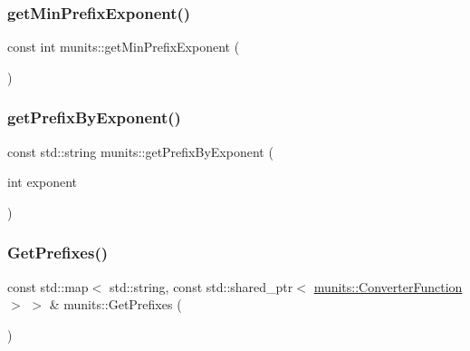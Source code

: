 \mbox{\label{namespacemunits_a348f0717c758e64ada5ef3811299af38}} 
\subsubsection{\texorpdfstring{get\+Min\+Prefix\+Exponent()}{getMinPrefixExponent()}}
{\footnotesize\ttfamily const int munits\+::get\+Min\+Prefix\+Exponent (\begin{DoxyParamCaption}{ }\end{DoxyParamCaption})}

\mbox{\label{namespacemunits_a9ee8078d5f9db8759156a3ff38f9cf39}} 
\subsubsection{\texorpdfstring{get\+Prefix\+By\+Exponent()}{getPrefixByExponent()}}
{\footnotesize\ttfamily const std\+::string munits\+::get\+Prefix\+By\+Exponent (\begin{DoxyParamCaption}\item[{int}]{exponent }\end{DoxyParamCaption})}

\mbox{\label{namespacemunits_a43150beff0a68af86df9d5a02e69b334}} 
\subsubsection{\texorpdfstring{Get\+Prefixes()}{GetPrefixes()}}
{\footnotesize\ttfamily const std\+::map$<$ std\+::string, const std\+::shared\+\_\+ptr$<$ \hyperlink{classmunits_1_1_converter_function}{munits\+::\+Converter\+Function} $>$ $>$ \& munits\+::\+Get\+Prefixes (\begin{DoxyParamCaption}{ }\end{DoxyParamCaption})}

\mbox{\label{namespacemunits_a38a90819b6f9b539204ec66e73b60a93}} 
